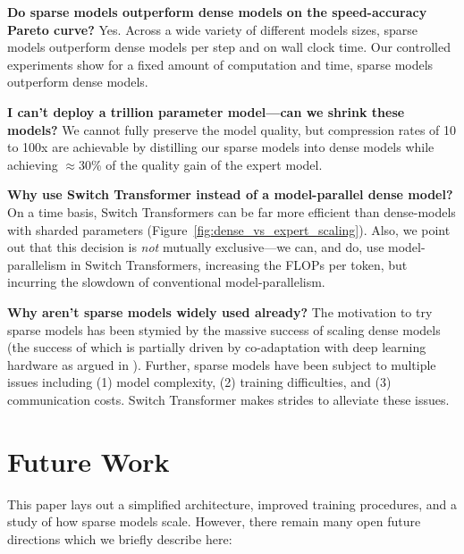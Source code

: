 \documentclass[twoside,11pt]{article}
\begin{document}
\textbf{Do sparse models outperform dense models on the speed-accuracy Pareto curve?}
Yes. Across a wide variety of different models sizes, sparse models outperform dense models per step and on wall clock time. Our controlled experiments show for a fixed amount of computation and time, sparse models outperform dense models. 

\textbf{I can't deploy a trillion parameter model---can we shrink these models?}
We cannot fully preserve the model quality, but compression rates of 10 to 100x are achievable by distilling our sparse models into dense models while achieving $\approx$30\% of the quality gain of the expert model.

\textbf{Why use Switch Transformer instead of a model-parallel dense model?} 
On a time basis, Switch Transformers can be far more efficient than dense-models with sharded parameters (Figure~\ref{fig:dense_vs_expert_scaling}).
Also, we point out that this decision is \emph{not} mutually exclusive---we can, and do, use model-parallelism in Switch Transformers, increasing the FLOPs per token, but incurring the slowdown of conventional model-parallelism.

\textbf{Why aren't sparse models widely used already?}
The motivation to try sparse models has been stymied by the massive success of scaling dense models (the success of which is partially driven by co-adaptation with deep learning hardware as argued in \cite{hooker2020hardware}). Further, sparse models have been subject to multiple issues including (1) model complexity, (2) training difficulties, and (3) communication costs.
Switch Transformer makes strides to alleviate these issues.

\section{Future Work}
This paper lays out a simplified architecture, improved training procedures, and a study of how sparse models scale.
However, there remain many open future directions which we briefly describe here:
\end{document}
